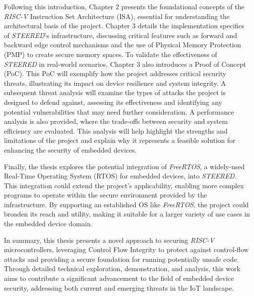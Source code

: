 Following this introduction, Chapter $2$ presents the foundational concepts of
the \textit{RISC-V} Instruction Set Architecture (ISA), essential for
understanding the architectural basis of the project. Chapter $3$ details the implementation
specifics of \textit{STEERED}'s infrastructure, discussing critical features such
as forward and backward edge control mechanisms and the use of Physical Memory Protection
(PMP) to create secure memory spaces. To validate the effectiveness of \textit{STEERED}
in real-world scenarios, Chapter $3$ also introduces a Proof of Concept (PoC). This
PoC will exemplify how the project addresses critical security threats,
illustrating its impact on device resilience and system integrity. A subsequent threat
analysis will examine the types of attacks the project is designed to defend against,
assessing its effectiveness and identifying any potential vulnerabilities that
may need further consideration. A performance analysis is also provided, where
the trade-offs between security and system efficiency are evaluated. This analysis
will help highlight the strengths and limitations of the project and explain why
it represents a feasible solution for enhancing the security of embedded devices.

Finally, the thesis explores the potential integration of \textit{FreeRTOS}, a
widely-used Real-Time Operating System (RTOS) for embedded devices, into \textit{STEERED}.
This integration could extend the project's applicability, enabling more complex
programs to operate within the secure environment provided by the infrastructure.
By supporting an established OS like \textit{FreeRTOS}, the project could broaden
its reach and utility, making it suitable for a larger variety of use cases in
the embedded device domain.

In summary, this thesis presents a novel approach to securing \textit{RISC-V}
microcontrollers, leveraging Control Flow Integrity to protect against control-flow
attacks and providing a secure foundation for running potentially unsafe code.
Through detailed technical exploration, demonstration, and analysis, this work aims
to contribute a significant advancement to the field of embedded device security,
addressing both current and emerging threats in the IoT landscape.